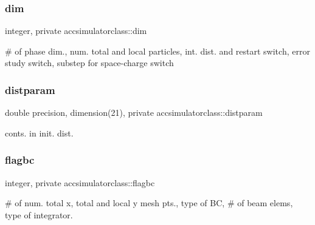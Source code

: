 \mbox{\label{namespaceaccsimulatorclass_a26217a3bed78a53045dc70c1ac59207a}} 
\subsubsection{\texorpdfstring{dim}{dim}}
{\footnotesize\ttfamily integer, private accsimulatorclass\+::dim\hspace{0.3cm}{\ttfamily [private]}}



\# of phase dim., num. total and local particles, int. dist. and restart switch, error study switch, substep for space-\/charge switch 

\mbox{\label{namespaceaccsimulatorclass_a1b6defb6bd9b1c4ddada0b30c99f4dd5}} 
\subsubsection{\texorpdfstring{distparam}{distparam}}
{\footnotesize\ttfamily double precision, dimension(21), private accsimulatorclass\+::distparam\hspace{0.3cm}{\ttfamily [private]}}



conts. in init. dist. 

\mbox{\label{namespaceaccsimulatorclass_a1ba011ab9980a00689505f8cbbd05732}} 
\subsubsection{\texorpdfstring{flagbc}{flagbc}}
{\footnotesize\ttfamily integer, private accsimulatorclass\+::flagbc\hspace{0.3cm}{\ttfamily [private]}}



\# of num. total x, total and local y mesh pts., type of BC, \# of beam elems, type of integrator. 

\mbox{\label{namespaceaccsimulatorclass_af61313c9e48dba34ab064f69f8d43183}} 
